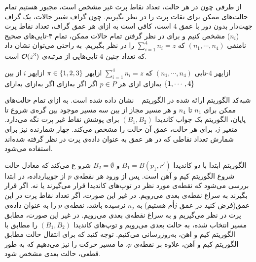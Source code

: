 از طرفی چون در هر حالت، تعداد نقاط پرت غیر مشخص است، مجبور هستیم تمام حالت‌های ممکن برای نقات پرت را در نظر بگیریم. چون گراف تغییر حالات، یک گراف جهت‌دار بدون دور با عمق $4$ است، کافی است به ازای هر عمق گراف، تعداد نقاط پرت ($n_i$) مشخص کنیم و برای در نظر گرفتن تمام حالات ممکن، تمام ۴‌-تایی‌های صحیح نامنفی $(n_1, \cdots, n_4)$  که $\sum_{i =1}^{4} n_i = z$ را در نظر بگیریم. به راحتی می‌توان نشان داد که تعداد چنین $4$-تایی‌هایی از مرتبه‌ی $\mathcal{O}(z^3)$ است.

‌ازای{هر $4$-تایی $(n_1, \cdots, n_4)$ که $\sum_{i=1}^4 n_i = z$}
‌ازای{هر $\pi \in \left\{ 1, 2, 3 \right\}$}
‌ازای{هر $i$ از بین $\left\{ 1, \cdots, 4 \right\}$}
‌به‌ازای{}
‌ازای{ هر $p \in P$}
‌اگر{}
‌اگر{}
‌به‌ازای{}
‌اگر{}
‌به‌ازای{}
‌به‌ازای{}

شبه‌کد الگوریتم ارائه شده در الگوریتم ~ نشان داده شده است. به ازای تمام حالت‌های ممکن برای $n_1$ تا $n_4$ و هر مسیر مجاز از‌ بین سه مسیر موجود بین گره‌ی شروع تا پایان، الگوریتم یک جواب کاندیدا $(B_1, B_2)$ برای پوشش نقاط غیر پرت نگه می‌دارد. متغیر $j$، برای هر حالت، عمق آن حالت را مشخص می‌کند. چهار شمارنده نیز برای شمارش تعداد نقاطی که در هر عمق به عنوان داده‌ی پرت در نظر گرفته شده‌اند استفاده می‌شود.

الگوریتم ابتدا با دو کاندیدا $B_1 = B(p_1, r')$ و $B_2 = \emptyset$ شرو ع می‌کند که معادل حالت شروع الگوریتم کیم و آهن است. پس از ورود هر نقطه‌ی $p$ از جویبارداده، در ابتدا بررسی می‌شود که نقطه‌ی مورد نظر در توپ‌های کاندیدا قرار می‌گیرند یا نه. اگر قرار بگیرند به سراغ نقطه‌ی بعدی می‌رویم. در غیر این صورت، اگر تعداد نقاط پرت در این عمق‌(فرض کنید در عمق $j$اُم هستیم) به $n_j$ نرسیده باشد، نقطه‌ی $p$ را به عنوان داده‌ی پرت در نظر می‌گیریم و به سراغ نقطه‌ی بعدی می‌رویم. در غیر این صورت، مطابق مسیر انتخاب شده، به حالت بعدی می‌رویم و توپ‌های کاندیدا $(B_1, B_2)$ را مطابق با الگوریتم کیم و اهن، به‌روزرسانی می‌کنیم. توجه کنید که برای انتقال حالت مطابق الگوریتم کیم و آهن، علاوه بر نقطه‌ی $p$، ما مسیر حرکت را نیز‌ می‌دهیم که به طور قطعی، حالت بعدی مشخص شود.

